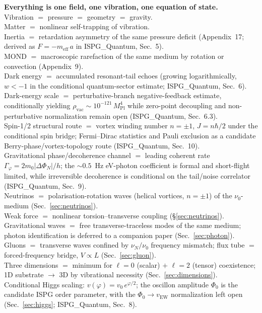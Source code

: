 \documentclass[11pt]{article}
\begin{document}
\begin{center}
{{\medskip
\textbf{Everything is one field, one vibration,
one equation of state.}\\[3pt]
Vibration $=$ pressure $=$ geometry $=$ gravity.\\
Matter $=$ nonlinear self-trapping of vibration.\\
Inertia $=$ retardation asymmetry of the same
pressure deficit (Appendix~17; derived as
$F = -m_{\mathrm{eff}}\,a$ in
ISPG\_Quantum, Sec.~5).\\
MOND $=$ macroscopic rarefaction of the same
medium by rotation or convection (Appendix~9).\\
Dark energy $=$ accumulated resonant-tail echoes
(growing logarithmically, $w < -1$ in the
conditional quantum-sector estimate;
ISPG\_Quantum, Sec.~6).\\
Dark-energy scale $=$ perturbative-branch
negative-feedback estimate, conditionally yielding
$\rho_{\mathrm{vac}} \sim 10^{-121}\,
M_{\mathrm{Pl}}^4$ while zero-point decoupling and
non-perturbative normalization remain open
(ISPG\_Quantum, Sec.~6.3).\\
Spin-1/2 structural route $=$ vortex winding number
$n = \pm 1$, $J = n\hbar/2$ under the conditional spin
bridge; Fermi--Dirac statistics and Pauli exclusion as a
candidate Berry-phase/vortex-topology route
(ISPG\_Quantum, Sec.~10).\\
Gravitational phase/decoherence channel $=$
leading coherent rate
$\Gamma_{\varphi} = 2m_0|\Delta\Phi_N|/h$;
the $\sim 0.5$~Hz eV-photon coefficient is formal and
short-flight limited, while irreversible decoherence is
conditional on the tail/noise correlator
(ISPG\_Quantum, Sec.~9).
\\
Neutrinos $=$ polarisation-rotation waves
(helical vortices, $n = \pm 1$) of the
$\nu_0$-medium (Sec.~\ref{sec:neutrinos}).\\
Weak force $=$ nonlinear torsion--transverse
coupling (\S\ref{sec:neutrinos}).\\
Gravitational waves $=$ free transverse-traceless
modes of the same medium; photon identification is
deferred to a companion paper
(Sec.~\ref{sec:photon}).\\
Gluons $=$ transverse waves confined by
$\nu_N/\nu_0$ frequency mismatch; flux tube
$=$ forced-frequency bridge, $V \propto L$
(Sec.~\ref{sec:gluon}).\\
Three dimensions $=$ minimum for
$\ell=0$ (scalar) $+$ $\ell=2$ (tensor)
coexistence; 1D substrate $\to$ 3D by
vibrational necessity
(Sec.~\ref{sec:dimensions}).\\
Conditional Higgs scaling:
$v(\varphi)=v_0\,e^{\varphi/2}$; the oscillon
amplitude $\Phi_0$ is the candidate ISPG order
parameter, with the $\Phi_0\to v_{\mathrm{EW}}$
normalization left open (Sec.~\ref{sec:higgs};
ISPG\_Quantum, Sec.~8).
}}
\end{center}
\end{document}
